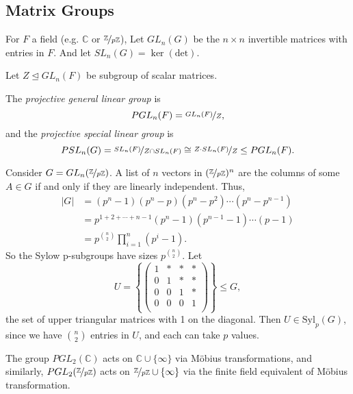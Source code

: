 \subsection{Matrix Groups}
For \(F\) a field (e.g. \(\mathbb{C}\) or \(\nicefrac{\mathbb{Z}}{p\mathbb{Z}}\)), Let \(GL_n(G)\) be the \(n\times n\) invertible matrices with entries in \(F\). And let \(SL_n(G) = \ker (\mathrm{det})\).

Let \(Z \trianglelefteq GL_n(F)\) be subgroup of scalar matrices.
\begin{definition}
    The \textit{projective general linear group} is
    \[
        PGL_n(F) = \nicefrac{GL_n(F)}{Z},
    \]
    and the \textit{projective special linear group} is
    \[
        PSL_n(G) = \nicefrac{SL_n(F)}{Z\cap SL_n(F)} \cong \nicefrac{Z\cdot SL_n(F)}{Z}\leq PGL_n(F).
    \]
\end{definition}
\begin{example}
    Consider \(G = GL_n(\nicefrac{\mathbb{Z}}{p\mathbb{Z}})\). A list of \(n\) vectors in \((\nicefrac{\mathbb{Z}}{p\mathbb{Z}})^n\) are the columns of some \(A\in G\) if and only if they are linearly independent. Thus,
    \begin{align*}
        \left\vert G \right\vert &= (p^n - 1)(p^n - p)(p^n - p^2)\cdots (p^n - p^{n-1})\\
        &= p^{1 + 2 + \cdots + n - 1}(p^n - 1)(p^{n-1} - 1)\cdots (p-1)\\
        &= p^{\binom{n}{2}}\prod\limits_{i=1}^{n} (p^i - 1).
    \end{align*}
    So the Sylow p-subgroups have sizes \(p^{\binom{n}{2}}\). Let
    \[
        U = \left\{\begin{pmatrix}
            1 & * & * &  * \\
            0 & 1 & * &  * \\
            0 & 0 & 1 &  * \\
            0 & 0 & 0 &  1 \\
        \end{pmatrix}\right\} \leq G,
    \]
    the set of upper triangular matrices with 1 on the diagonal. Then \(U \in \mathrm{Syl}_p(G)\), since we have \(\binom{n}{2}\) entries in \(U\), and each can take \(p\) values.
\end{example}
The group \(PGL_2(\mathbb{C})\) acts on \(\mathbb{C}\cup \{\infty\}\) via Möbius transformations, and similarly, \(PGL_2(\nicefrac{\mathbb{Z}}{p\mathbb{Z}})\) acts on \(\nicefrac{\mathbb{Z}}{p\mathbb{Z}}\cup \{\infty\}\) via the finite field equivalent of Möbius transformation.

